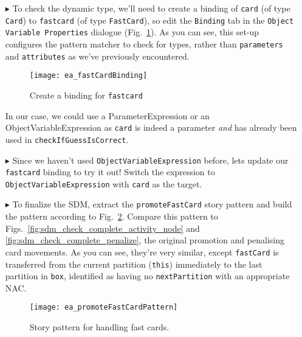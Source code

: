 \begin{itemize}
\vspace{0.5cm}
 
\item[$\blacktriangleright$] To check the dynamic type, we'll need to create a binding of \texttt{card} (of type \texttt{Card}) to \texttt{fastcard} (of
type \texttt{FastCard}), so edit the \texttt{Binding} tab in the \texttt{Object Variable Properties} dialogue (Fig.~\ref{fig:fastCardBinding}). As you can see,
this set-up configures the pattern matcher to check for types, rather than \texttt{parameters} and \texttt{attributes} as we've previously encountered.
  
\begin{figure}[htbp]
\begin{center}
  \texttt{[image: ea\_fastCardBinding]}
  \caption{Create a binding for \texttt{fastcard}}  
  \label{fig:fastCardBinding}
\end{center}
\end{figure}

 \clearpage

In our case, we could use a ParameterExpression or an ObjectVariableExpression as \texttt{card} is indeed a parameter \emph{and} has already been used in
\texttt{checkIfGuessIsCorrect}. 

\vspace{0.5cm}

\item[$\blacktriangleright$] Since we haven't used \texttt{ObjectVariableExpression} before, lets update our \texttt{fastcard} binding to try it out! Switch
the expression to \texttt{Object\-Vari\-able\-Ex\-pres\-sion} with \texttt{card} as the target. 

\clearpage

\item[$\blacktriangleright$] To finalize the SDM, extract the \texttt{promoteFastCard} story pattern and build the pattern according to
Fig.~\ref{fig:promoteFastCardPattern}. Compare this pattern to Figs.~\ref{fig:sdm_check_complete_activity_node} and \ref{fig:sdm_check_complete_penalize}, the
original promotion and penalising card movements. As you can see, they're very similar, except \texttt{fastCard} is transferred from the current partition
(\texttt{this}) immediately to the last partition in \texttt{box}, identified as having no \texttt{nextPartition} with an appropriate NAC.

\vspace{0.5cm}

\begin{figure}[htbp]
\begin{center}
  \texttt{[image: ea\_promoteFastCardPattern]}
  \caption{Story pattern for handling fast cards.}  
  \label{fig:promoteFastCardPattern}
\end{center}
\end{figure}


\end{itemize}
